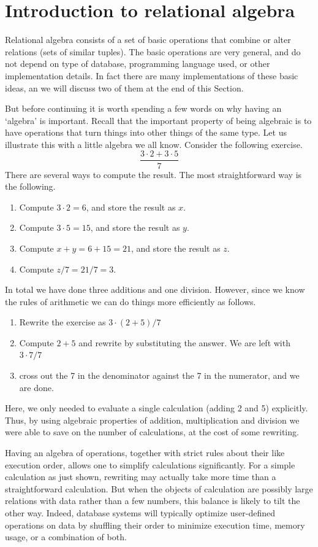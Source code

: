 \section{Introduction to relational algebra}
Relational algebra consists of a set of basic operations that combine or alter
relations (sets of similar tuples). The basic operations are very general, and
do not depend on type of database, programming language used, or other
implementation details. In fact there are many implementations of these basic
ideas, an we will discuss two of them at the end of this Section.

But before continuing it is worth spending a few words on why having an
`algebra' is important. Recall that the important property of being algebraic
is to have operations that turn things into other things of the same type. Let
us illustrate this with a little algebra we all know. Consider the following
exercise.
$$
\frac{3\cdot 2 + 3\cdot5}{7}
$$
There are several ways to compute the result. The most straightforward way
is the following.
\begin{enumerate}
\item Compute $3\cdot 2=6$, and store the result as $x$.
\item Compute $3\cdot 5=15$, and store the result as $y$.
\item Compute $x+y=6+15=21$, and store the result as $z$.
\item Compute $z/7=21/7=3$.
\end{enumerate}
In total we have done three additions and one division. However, since we know
the rules of arithmetic we can do things more efficiently as follows.
\begin{enumerate}
\item Rewrite the exercise as
$
{3\cdot(2+5)}/{7}
$
\item Compute $2+5$ and rewrite by substituting the answer. We are left with
$
{3\cdot 7}/{7}
$
\item cross out the 7 in the denominator against the 7 in the numerator,
and we are done.
\end{enumerate}
Here, we only needed to evaluate a single calculation (adding 2 and 5)
explicitly. Thus, by using algebraic properties of addition, multiplication and
division we were able to save on the number of calculations, at the cost of
some rewriting. 

Having an algebra of operations, together with strict rules about their like
execution order, allows one to simplify calculations significantly.  For a
simple calculation as just shown, rewriting may actually take more time than a
straightforward calculation. But when the objects of calculation are possibly
large relations with data rather than a few numbers, this balance is likely to
tilt the other way.  Indeed, database systems will typically optimize
user-defined operations on data by shuffling their order to minimize execution
time, memory usage, or a combination of both.

